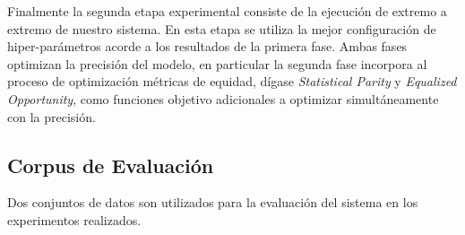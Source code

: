 Finalmente la segunda etapa experimental consiste de la ejecución de extremo a extremo de nuestro sistema.
En esta etapa se utiliza la mejor configuración de hiper-parámetros acorde a los resultados de la primera fase.
Ambas fases optimizan la precisión del modelo, en particular la segunda fase incorpora al proceso de optimización métricas de equidad, dígase \emph{Statistical Parity} y \emph{Equalized Opportunity}, como funciones objetivo adicionales a optimizar simultáneamente con la precisión.

\subsection{Corpus de Evaluación}\label{section:evaluation-corpus}

Dos conjuntos de datos son utilizados para la evaluación del sistema en los experimentos realizados.

